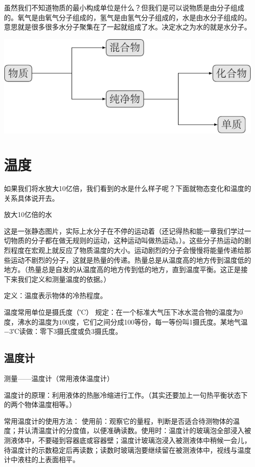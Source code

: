 \documentclass[12pt]{exam}
\begin{document}
虽然我们不知道物质的最小构成单位是什么？但我们是可以说物质是由分子组成的。氧气是由氧气分子组成的，氢气是由氢气分子组成的，水是由水分子组成的。意思就是很多很多水分子聚集在了一起就组成了水。决定水之为水的就是水分子。


\includegraphics[scale=1]{figures/物质分类.pdf} 



\section{温度}
如果我们将水放大10亿倍，我们看到的水是什么样子呢？下面就物态变化和温度的关系具体说开去。
\begin{fig}{放大10亿倍的水}
\end{fig}


这是一张静态图片，实际上水分子在不停的运动着（还记得热和能一章我们学过一切物质的分子都在做无规则的运动，这种运动叫做热运动。）。这些分子热运动的剧烈程度在宏观上就反应了物质温度的大小。运动剧烈的分子会慢慢将能量传递给那些运动不剧烈的分子，这就是热量的传递。热量总是从温度高的地方传到温度低的地方。（热量总是自发的从温度高的地方传到低的地方，直到温度平衡。这正是接下来我们定义和测量温度的依据。）


定义：温度表示物体的冷热程度。

温度常用单位是摄氏度（℃） 规定：在一个标准大气压下冰水混合物的温度为$0$度，沸水的温度为$100$度，它们之间分成100等份，每一等份叫1摄氏度。某地气温$-3$℃读做：零下3摄氏度或负3摄氏度。


\subsection{温度计}
测量——温度计（常用液体温度计）

温度计的原理：利用液体的热胀冷缩进行工作。（其实还要加上一句热平衡状态下的两个物体温度相等。）

常用温度计的使用方法：
使用前：观察它的量程，判断是否适合待测物体的温度；并认清温度计的分度值，以便准确读数。使用时：温度计的玻璃泡全部浸入被测液体中，不要碰到容器底或容器壁；温度计玻璃泡浸入被测液体中稍候一会儿，待温度计的示数稳定后再读数；读数时玻璃泡要继续留在被测液体中，视线与温度计中液柱的上表面相平。
\end{document}
